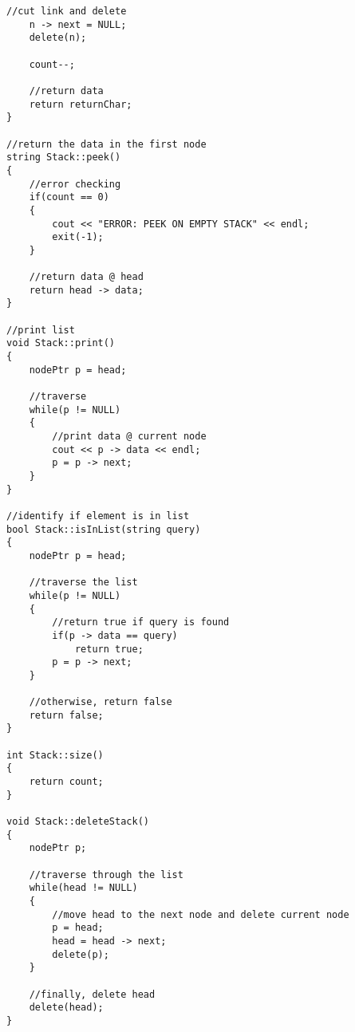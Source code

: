 \begin{lstlisting}[style=cppstyle, caption={stackADT.cpp}]
    //cut link and delete
    n -> next = NULL;
    delete(n);

    count--;

    //return data
    return returnChar;
}

//return the data in the first node
string Stack::peek()
{
    //error checking
    if(count == 0)
    {
        cout << "ERROR: PEEK ON EMPTY STACK" << endl;
        exit(-1);
    }

    //return data @ head
    return head -> data;
}

//print list
void Stack::print()
{
    nodePtr p = head;

    //traverse
    while(p != NULL)
    {
        //print data @ current node
        cout << p -> data << endl;
        p = p -> next;
    }
}

//identify if element is in list
bool Stack::isInList(string query)
{
    nodePtr p = head;

    //traverse the list
    while(p != NULL)
    {
        //return true if query is found
        if(p -> data == query)
            return true;
        p = p -> next;
    }

    //otherwise, return false
    return false;
}

int Stack::size()
{
    return count;
}

void Stack::deleteStack()
{
    nodePtr p;

    //traverse through the list
    while(head != NULL)
    {
        //move head to the next node and delete current node
        p = head;
        head = head -> next;
        delete(p);
    }

    //finally, delete head
    delete(head);
}

\end{lstlisting}
